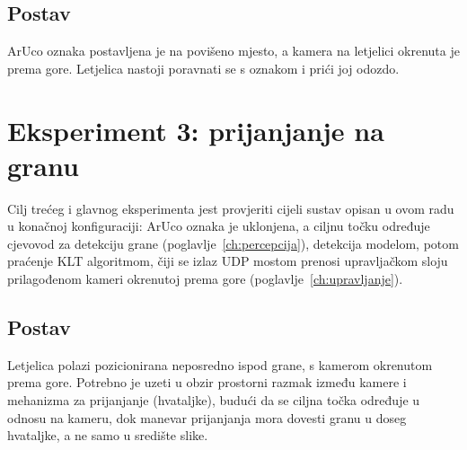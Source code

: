 \subsection{Postav}
\label{subsec:test2-postav}
ArUco oznaka postavljena je na povišeno mjesto, a kamera na letjelici okrenuta je prema gore. Letjelica nastoji poravnati se s oznakom i prići joj odozdo.

\section{Eksperiment 3: prijanjanje na granu}
\label{sec:test3}

Cilj trećeg i glavnog eksperimenta jest provjeriti cijeli sustav opisan u ovom radu u konačnoj konfiguraciji: ArUco oznaka je uklonjena, a ciljnu točku određuje cjevovod za detekciju grane (poglavlje~\ref{ch:percepcija}), detekcija modelom, potom praćenje KLT algoritmom, čiji se izlaz UDP mostom prenosi upravljačkom sloju prilagođenom kameri okrenutoj prema gore (poglavlje~\ref{ch:upravljanje}).

\subsection{Postav}
\label{subsec:test3-postav}
Letjelica polazi pozicionirana neposredno ispod grane, s kamerom okrenutom prema gore. Potrebno je uzeti u obzir prostorni razmak između kamere i mehanizma za prijanjanje (hvataljke), budući da se ciljna točka određuje u odnosu na kameru, dok manevar prijanjanja mora dovesti granu u doseg hvataljke, a ne samo u središte slike.

